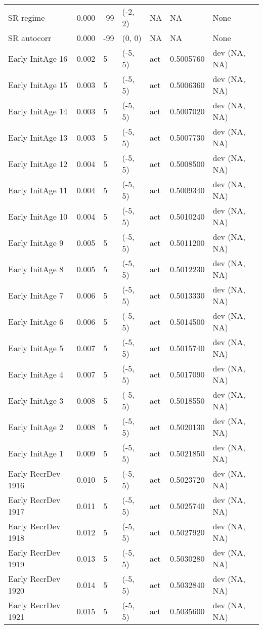 \documentclass[11pt,
  english,
  letterpaper,
]{article}
\begin{document}
\begin{landscape}
\begin{longtable}[t]{>{\raggedright\arraybackslash}p{7cm}lllll>{\raggedright\arraybackslash}p{4cm}}
SR regime & 0.000 & -99 & (-2, 2) & NA & NA & None\\
SR autocorr & 0.000 & -99 & (0, 0) & NA & NA & None\\
Early InitAge 16 & 0.002 & 5 & (-5, 5) & act & 0.5005760 & dev (NA, NA)\\
Early InitAge 15 & 0.003 & 5 & (-5, 5) & act & 0.5006360 & dev (NA, NA)\\
Early InitAge 14 & 0.003 & 5 & (-5, 5) & act & 0.5007020 & dev (NA, NA)\\
Early InitAge 13 & 0.003 & 5 & (-5, 5) & act & 0.5007730 & dev (NA, NA)\\
Early InitAge 12 & 0.004 & 5 & (-5, 5) & act & 0.5008500 & dev (NA, NA)\\
Early InitAge 11 & 0.004 & 5 & (-5, 5) & act & 0.5009340 & dev (NA, NA)\\
Early InitAge 10 & 0.004 & 5 & (-5, 5) & act & 0.5010240 & dev (NA, NA)\\
Early InitAge 9 & 0.005 & 5 & (-5, 5) & act & 0.5011200 & dev (NA, NA)\\
Early InitAge 8 & 0.005 & 5 & (-5, 5) & act & 0.5012230 & dev (NA, NA)\\
Early InitAge 7 & 0.006 & 5 & (-5, 5) & act & 0.5013330 & dev (NA, NA)\\
Early InitAge 6 & 0.006 & 5 & (-5, 5) & act & 0.5014500 & dev (NA, NA)\\
Early InitAge 5 & 0.007 & 5 & (-5, 5) & act & 0.5015740 & dev (NA, NA)\\
Early InitAge 4 & 0.007 & 5 & (-5, 5) & act & 0.5017090 & dev (NA, NA)\\
Early InitAge 3 & 0.008 & 5 & (-5, 5) & act & 0.5018550 & dev (NA, NA)\\
Early InitAge 2 & 0.008 & 5 & (-5, 5) & act & 0.5020130 & dev (NA, NA)\\
Early InitAge 1 & 0.009 & 5 & (-5, 5) & act & 0.5021850 & dev (NA, NA)\\
Early RecrDev 1916 & 0.010 & 5 & (-5, 5) & act & 0.5023720 & dev (NA, NA)\\
Early RecrDev 1917 & 0.011 & 5 & (-5, 5) & act & 0.5025740 & dev (NA, NA)\\
Early RecrDev 1918 & 0.012 & 5 & (-5, 5) & act & 0.5027920 & dev (NA, NA)\\
Early RecrDev 1919 & 0.013 & 5 & (-5, 5) & act & 0.5030280 & dev (NA, NA)\\
Early RecrDev 1920 & 0.014 & 5 & (-5, 5) & act & 0.5032840 & dev (NA, NA)\\
Early RecrDev 1921 & 0.015 & 5 & (-5, 5) & act & 0.5035600 & dev (NA, NA)\\

\end{longtable}
\end{landscape}
\end{document}
